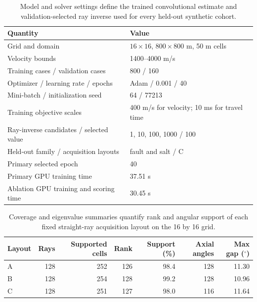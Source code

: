 \begin{table}[htbp]
\centering
\small
\caption{Model and solver settings define the trained convolutional estimate and validation-selected ray inverse used for every held-out synthetic cohort.}
\label{tab:parameters}
\begin{tabular}{ll}
\toprule
Quantity & Value \\
\midrule
Grid and domain & $16\times16$, $800\times800$ m, 50 m cells \\
Velocity bounds & 1400--4000 m/s \\
Training cases / validation cases & 800 / 160 \\
Optimizer / learning rate / epochs & Adam / 0.001 / 40 \\
Mini-batch / initialization seed & 64 / 77213 \\
Training objective scales & 400 m/s for velocity; 10 ms for travel time \\
Ray-inverse candidates / selected value & 1, 10, 100, 1000 / 100 \\
Held-out family / acquisition layouts & fault and salt / C \\
Primary selected epoch & 40 \\
Primary GPU training time & 37.51 s \\
Ablation GPU training and scoring time & 30.45 s \\
\bottomrule
\end{tabular}
\end{table}

\clearpage
\begin{table}[htbp]
\centering
\small
\caption{Coverage and eigenvalue summaries quantify rank and angular support of each fixed straight-ray acquisition layout on the 16 by 16 grid.}
\label{tab:kernel-diagnostics}
\begin{tabular}{lrrrrrr}
\toprule
Layout & Rays & Supported cells & Rank & Support (\%) & Axial angles & Max gap ($^\circ$) \\
\midrule
A & 128 & 252 & 126 & 98.4 & 128 & 11.30 \\
B & 128 & 254 & 128 & 99.2 & 128 & 10.96 \\
C & 128 & 251 & 127 & 98.0 & 116 & 11.64 \\
\bottomrule
\end{tabular}
\end{table}
